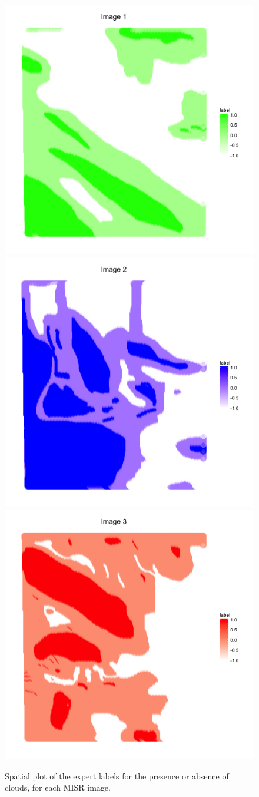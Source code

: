 \documentclass[11pt]{article}\usepackage[]{graphicx}\usepackage[]{color}
\newenvironment{knitrout}{}{} %
\begin{document}
\begin{knitrout}
\color{fgcolor}\begin{figure}[]

\includegraphics[width=0.49\linewidth]{figure/map-plot-labels-1} 
\includegraphics[width=0.49\linewidth]{figure/map-plot-labels-2} 
\includegraphics[width=0.49\linewidth]{figure/map-plot-labels-3} \caption[Spatial plot of the expert labels for the presence or absence of clouds, for each MISR image]{Spatial plot of the expert labels for the presence or absence of clouds, for each MISR image.\label{fig:map-plot-labels}}
\end{figure}


\end{knitrout}
\end{document}

